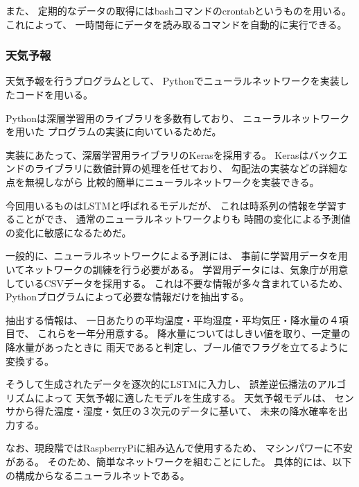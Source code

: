 \documentclass{jsarticle}
\begin{document}
          また、
          定期的なデータの取得にはbashコマンドのcrontabというものを用いる。
          これによって、
          一時間毎にデータを読み取るコマンドを自動的に実行できる。
          
        \subsubsection{天気予報}
        
          天気予報を行うプログラムとして、
          Pythonでニューラルネットワークを実装したコードを用いる。
          
          Pythonは深層学習用のライブラリを多数有しており、
          ニューラルネットワークを用いた
          プログラムの実装に向いているためだ。
          
          実装にあたって、深層学習用ライブラリのKerasを採用する。
          Kerasはバックエンドのライブラリに数値計算の処理を任せており、
          勾配法の実装などの詳細な点を無視しながら
          比較的簡単にニューラルネットワークを実装できる。
          
          今回用いるものはLSTM\cite{Hochreiter}と呼ばれるモデルだが、
          これは時系列の情報を学習することができ、
          通常のニューラルネットワークよりも
          時間の変化による予測値の変化に敏感になるためだ。
          
          一般的に、ニューラルネットワークによる予測には、
          事前に学習用データを用いてネットワークの訓練を行う必要がある。
          学習用データには、気象庁が用意しているCSVデータを採用する。
          これは不要な情報が多々含まれているため、
          Pythonプログラムによって必要な情報だけを抽出する。
          
          抽出する情報は、
          一日あたりの平均温度・平均湿度・平均気圧・降水量の４項目で、
          これらを一年分用意する。
          降水量についてはしきい値を取り、一定量の降水量があったときに
          雨天であると判定し、ブール値でフラグを立てるように変換する。

          そうして生成されたデータを逐次的にLSTMに入力し、
          誤差逆伝播法\cite{Le}のアルゴリズムによって
          天気予報に適したモデルを生成する。
          天気予報モデルは、
          センサから得た温度・湿度・気圧の３次元のデータに基いて、
          未来の降水確率を出力する。

          なお、現段階ではRaspberryPiに組み込んで使用するため、
          マシンパワーに不安がある。
          そのため、簡単なネットワークを組むことにした。
          具体的には、以下の構成からなるニューラルネットである。
\end{document}
